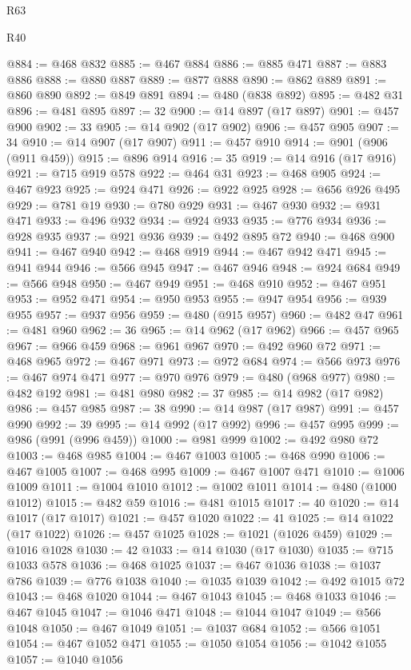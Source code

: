 \begin{lexlean}{R63}
\begin{lexlean}{R40}
\begin{coremodule}
{{{{{{{{{{{{{{{{{{{{{{{{{{{{{{{{{{{{{{{{{{{{{{{{{{{{{{{{{{{{{{{{{{{{{{{{{{{{{{{{{{{{{{{{{{{{{{{{{{{{{{{{{{{{{@884 := @468 @832
@885 := @467 @884
@886 := @885 @471
@887 := @883 @886
@888 := @880 @887
@889 := @877 @888
@890 := @862 @889
@891 := @860 @890
@892 := @849 @891
@894 := @480 (@838 @892)
@895 := @482 @31
@896 := @481 @895
@897 := 32
@900 := @14 @897 (@17 @897)
@901 := @457 @900
@902 := 33
@905 := @14 @902 (@17 @902)
@906 := @457 @905
@907 := 34
@910 := @14 @907 (@17 @907)
@911 := @457 @910
@914 := @901 (@906 (@911 @459))
@915 := @896 @914
@916 := 35
@919 := @14 @916 (@17 @916)
@921 := @715 @919 @578
@922 := @464 @31
@923 := @468 @905
@924 := @467 @923
@925 := @924 @471
@926 := @922 @925
@928 := @656 @926 @495
@929 := @781 @19
@930 := @780 @929
@931 := @467 @930
@932 := @931 @471
@933 := @496 @932
@934 := @924 @933
@935 := @776 @934
@936 := @928 @935
@937 := @921 @936
@939 := @492 @895 @72
@940 := @468 @900
@941 := @467 @940
@942 := @468 @919
@944 := @467 @942 @471
@945 := @941 @944
@946 := @566 @945
@947 := @467 @946
@948 := @924 @684
@949 := @566 @948
@950 := @467 @949
@951 := @468 @910
@952 := @467 @951
@953 := @952 @471
@954 := @950 @953
@955 := @947 @954
@956 := @939 @955
@957 := @937 @956
@959 := @480 (@915 @957)
@960 := @482 @47
@961 := @481 @960
@962 := 36
@965 := @14 @962 (@17 @962)
@966 := @457 @965
@967 := @966 @459
@968 := @961 @967
@970 := @492 @960 @72
@971 := @468 @965
@972 := @467 @971
@973 := @972 @684
@974 := @566 @973
@976 := @467 @974 @471
@977 := @970 @976
@979 := @480 (@968 @977)
@980 := @482 @192
@981 := @481 @980
@982 := 37
@985 := @14 @982 (@17 @982)
@986 := @457 @985
@987 := 38
@990 := @14 @987 (@17 @987)
@991 := @457 @990
@992 := 39
@995 := @14 @992 (@17 @992)
@996 := @457 @995
@999 := @986 (@991 (@996 @459))
@1000 := @981 @999
@1002 := @492 @980 @72
@1003 := @468 @985
@1004 := @467 @1003
@1005 := @468 @990
@1006 := @467 @1005
@1007 := @468 @995
@1009 := @467 @1007 @471
@1010 := @1006 @1009
@1011 := @1004 @1010
@1012 := @1002 @1011
@1014 := @480 (@1000 @1012)
@1015 := @482 @59
@1016 := @481 @1015
@1017 := 40
@1020 := @14 @1017 (@17 @1017)
@1021 := @457 @1020
@1022 := 41
@1025 := @14 @1022 (@17 @1022)
@1026 := @457 @1025
@1028 := @1021 (@1026 @459)
@1029 := @1016 @1028
@1030 := 42
@1033 := @14 @1030 (@17 @1030)
@1035 := @715 @1033 @578
@1036 := @468 @1025
@1037 := @467 @1036
@1038 := @1037 @786
@1039 := @776 @1038
@1040 := @1035 @1039
@1042 := @492 @1015 @72
@1043 := @468 @1020
@1044 := @467 @1043
@1045 := @468 @1033
@1046 := @467 @1045
@1047 := @1046 @471
@1048 := @1044 @1047
@1049 := @566 @1048
@1050 := @467 @1049
@1051 := @1037 @684
@1052 := @566 @1051
@1054 := @467 @1052 @471
@1055 := @1050 @1054
@1056 := @1042 @1055
@1057 := @1040 @1056
}}}}}}}}}}}}}}}}}}}}}}}}}}}}}}}}}}}}}}}}}}}}}}}}}}}}}}}}}}}}}}}}}}}}}}}}}}}}}}}}}}}}}}}}}}}}}}}}}}}}}}}}}}}}}
\end{coremodule}
\end{lexlean}
\end{lexlean}
